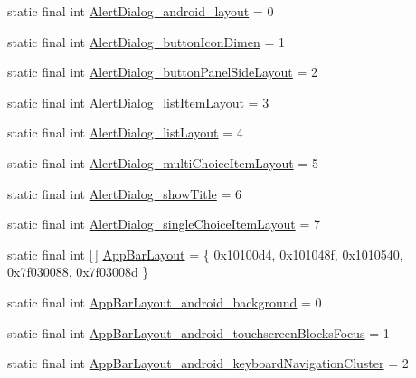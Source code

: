 \begin{DoxyCompactItemize}
\item 
static final int \mbox{\hyperlink{classandroid_1_1support_1_1design_1_1_r_1_1styleable_a71bc85e6ec9ee647058ddec18999bc91}{Alert\+Dialog\+\_\+android\+\_\+layout}} = 0
\item 
static final int \mbox{\hyperlink{classandroid_1_1support_1_1design_1_1_r_1_1styleable_a855d3fe8bf8822124da419640b0ddf10}{Alert\+Dialog\+\_\+button\+Icon\+Dimen}} = 1
\item 
static final int \mbox{\hyperlink{classandroid_1_1support_1_1design_1_1_r_1_1styleable_a409ae73aecd7c9e5a57bc54add92d3ce}{Alert\+Dialog\+\_\+button\+Panel\+Side\+Layout}} = 2
\item 
static final int \mbox{\hyperlink{classandroid_1_1support_1_1design_1_1_r_1_1styleable_a65581c0e854793dd465d4fd5571d102e}{Alert\+Dialog\+\_\+list\+Item\+Layout}} = 3
\item 
static final int \mbox{\hyperlink{classandroid_1_1support_1_1design_1_1_r_1_1styleable_a8fafa3e0c1cdb4161960369a508c8a96}{Alert\+Dialog\+\_\+list\+Layout}} = 4
\item 
static final int \mbox{\hyperlink{classandroid_1_1support_1_1design_1_1_r_1_1styleable_a77a0dbf6bd7bd9b4f3b521a0e75826b5}{Alert\+Dialog\+\_\+multi\+Choice\+Item\+Layout}} = 5
\item 
static final int \mbox{\hyperlink{classandroid_1_1support_1_1design_1_1_r_1_1styleable_ab0bb353b16886aa91970d5f8234922b7}{Alert\+Dialog\+\_\+show\+Title}} = 6
\item 
static final int \mbox{\hyperlink{classandroid_1_1support_1_1design_1_1_r_1_1styleable_a3740e6ae8888268dd6b9ed155ea53f8e}{Alert\+Dialog\+\_\+single\+Choice\+Item\+Layout}} = 7
\item 
static final int \mbox{[}$\,$\mbox{]} \mbox{\hyperlink{classandroid_1_1support_1_1design_1_1_r_1_1styleable_ad4af8881949a584d986f4bfadb3e8482}{App\+Bar\+Layout}} = \{ 0x10100d4, 0x101048f, 0x1010540, 0x7f030088, 0x7f03008d \}
\item 
static final int \mbox{\hyperlink{classandroid_1_1support_1_1design_1_1_r_1_1styleable_ae73de4f6a34a79953b359c4b89876a2d}{App\+Bar\+Layout\+\_\+android\+\_\+background}} = 0
\item 
static final int \mbox{\hyperlink{classandroid_1_1support_1_1design_1_1_r_1_1styleable_a6bfe17f5cc1f4599f04120c3ee8b6375}{App\+Bar\+Layout\+\_\+android\+\_\+touchscreen\+Blocks\+Focus}} = 1
\item 
static final int \mbox{\hyperlink{classandroid_1_1support_1_1design_1_1_r_1_1styleable_a5a0eb62cecd5001adfdd4b39bb7f715e}{App\+Bar\+Layout\+\_\+android\+\_\+keyboard\+Navigation\+Cluster}} = 2

\end{DoxyCompactItemize}

